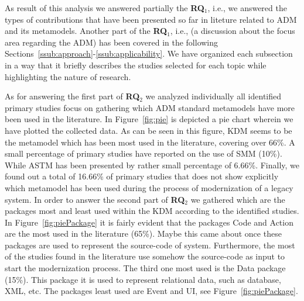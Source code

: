 

 As result of this analysis we answered partially the \textbf{RQ$_1$}, i.e., we answered the types of contributions that have been presented so far in liteture related to ADM and its metamodels. Another part of the \textbf{RQ$_1$}, i.e., (a discussion about the focus area regarding the ADM) has been covered in the following Sections~\ref{ssub:approach}-\ref{ssub:applicability}. We have organized each subsection in a way that it briefly describes the studies selected for each topic while highlighting the nature of research.

As for answering the first part of \textbf{RQ$_2$} we analyzed individually all identified primary studies focus on gathering which ADM standard metamodels have more been used in the literature.  In Figure~\ref{fig:pie} is depicted a pie chart wherein we have plotted the collected data. As can be seen in this figure, KDM seems to be the metamodel which has been most used in the literature, covering over 66\%. A small percentage of primary studies have reported on the use of SMM (10\%). While ASTM has been presented by rather small percentage of 6.66\%. Finally, we found out a total of 16.66\% of primary studies that does not show explicitly which metamodel has been used during the process of modernization of a legacy system. In order to answer the second part of \textbf{RQ$_2$} we gathered which are the packages most and least used within the KDM according to the identified studies. In Figure~\ref{fig:piePackage} it is fairly evident that the packages Code and Action are the most used in the literature (65\%). Maybe this came about once these packages are used to represent the source-code of system. Furthermore, the most of the studies found in the literature use somehow the source-code as input to start the modernization process. The third one most used is the Data package (15\%). This package it is used to represent relational data, such as database, XML, etc. The packages least used are Event and UI, see Figure~\ref{fig:piePackage}. 



